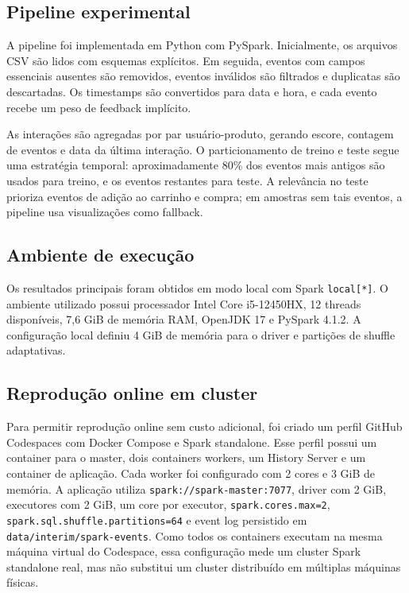 \documentclass[12pt]{article}
\begin{document}
\subsection{Pipeline experimental}

A pipeline foi implementada em Python com PySpark. Inicialmente, os arquivos
CSV s\~ao lidos com esquemas expl\'icitos. Em seguida, eventos com campos
essenciais ausentes s\~ao removidos, eventos inv\'alidos s\~ao filtrados e
duplicatas s\~ao descartadas. Os timestamps s\~ao convertidos para data e hora,
e cada evento recebe um peso de feedback impl\'icito.

As intera\c{c}\~oes s\~ao agregadas por par usu\'ario-produto, gerando escore,
contagem de eventos e data da \'ultima intera\c{c}\~ao. O particionamento de
treino e teste segue uma estrat\'egia temporal: aproximadamente 80\% dos
eventos mais antigos s\~ao usados para treino, e os eventos restantes para
teste. A relev\^ancia no teste prioriza eventos de adi\c{c}\~ao ao carrinho e
compra; em amostras sem tais eventos, a pipeline usa visualiza\c{c}\~oes como
fallback.

\subsection{Ambiente de execu\c{c}\~ao}

Os resultados principais foram obtidos em modo local com Spark
\texttt{local[*]}. O ambiente utilizado possui processador Intel Core
i5-12450HX, 12 threads dispon\'iveis, 7{,}6 GiB de mem\'oria RAM, OpenJDK 17 e
PySpark 4.1.2. A configura\c{c}\~ao local definiu 4 GiB de mem\'oria para o
driver e parti\c{c}\~oes de shuffle adaptativas.

\subsection{Reprodu\c{c}\~ao online em cluster}

Para permitir reprodu\c{c}\~ao online sem custo adicional, foi criado um perfil
GitHub Codespaces com Docker Compose e Spark standalone. Esse perfil possui
um container para o master, dois containers workers, um History Server e um
container de aplica\c{c}\~ao. Cada worker foi configurado com 2 cores e 3 GiB de
mem\'oria. A aplica\c{c}\~ao utiliza \texttt{spark://spark-master:7077}, driver
com 2 GiB, executores com 2 GiB, um core por executor,
\texttt{spark.cores.max=2}, \texttt{spark.sql.shuffle.partitions=64} e event
log persistido em \texttt{data/interim/spark-events}. Como todos os containers
executam na mesma m\'aquina virtual do Codespace, essa configura\c{c}\~ao mede
um cluster Spark standalone real, mas n\~ao substitui um cluster distribu\'ido
em m\'ultiplas m\'aquinas f\'isicas.
\end{document}
